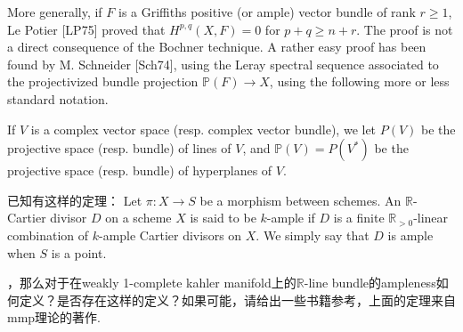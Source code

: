 \documentclass[lang=cn,zihao=-4,a4paper,fontset=none]{beautybook}
\begin{document}
More generally, if $F$ is a Griffiths positive (or ample) vector bundle of rank $r \geqslant 1$, Le Potier [LP75] proved that $H^{p, q}(X, F)=0$ for $p+q \geqslant n+r$. The proof is not a direct consequence of the Bochner technique. A rather easy proof has been found by M. Schneider [Sch74], using the Leray spectral sequence associated to the projectivized bundle projection $\mathbb{P}(F) \rightarrow X$, using the following more or less standard notation.


\begin{proposition}[][Notation.]
    If $V$ is a complex vector space (resp. complex vector bundle), we let $P(V)$ be the projective space (resp. bundle) of lines of $V$, and $\mathbb{P}(V)=P\left(V^*\right)$ be the projective space (resp. bundle) of hyperplanes of $V$.
\end{proposition}
    

\begin{problem}[][问题1][prob:1]
    已知有这样的定理：
     Let $\pi: X \rightarrow S$ be a morphism between schemes. An $\mathbb{R}$-Cartier divisor $D$ on a scheme $X$ is said to be $k$-ample if $D$ is a finite $\mathbb{R}_{>0}$-linear combination of $k$-ample Cartier divisors on $X$. We simply say that $D$ is ample when $S$ is a point.

    ，那么对于在weakly 1-complete kahler manifold上的$\mathbb{R}$-line bundle的ampleness如何定义？是否存在这样的定义？如果可能，请给出一些书籍参考，上面的定理来自mmp理论的著作.
\end{problem}
    


\end{document}
